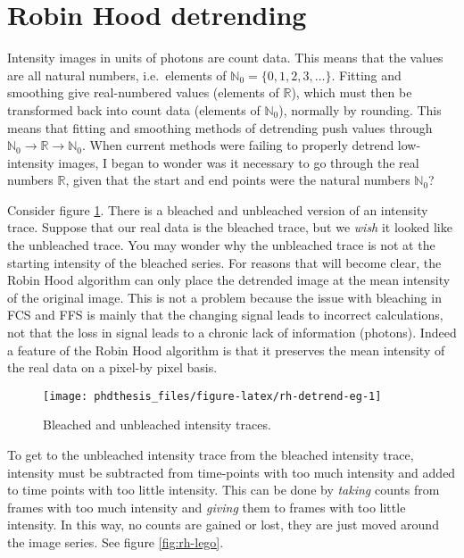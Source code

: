 \documentclass[12pt,]{book}
\theoremstyle{definition}
\theoremstyle{definition}
\theoremstyle{definition}
\theoremstyle{remark}
\begin{document}
\section{Robin Hood detrending}\label{robin-hood-detrending}

Intensity images in units of photons are count data. This means that the
values are all natural numbers, i.e.~elements of
\(\mathbb{N}_0=\{0, 1, 2, 3, \ldots\}\). Fitting and smoothing give
real-numbered values (elements of \(\mathbb{R}\)), which must then be
transformed back into count data (elements of \(\mathbb{N}_0\)),
normally by rounding. This means that fitting and smoothing methods of
detrending push values through
\(\mathbb{N}_0 \rightarrow \mathbb{R} \rightarrow \mathbb{N}_0\). When
current methods were failing to properly detrend low-intensity images, I
began to wonder was it necessary to go through the real numbers
\(\mathbb{R}\), given that the start and end points were the natural
numbers \(\mathbb{N}_0\)?

Consider figure \ref{fig:rh-detrend-eg}. There is a bleached and
unbleached version of an intensity trace. Suppose that our real data is
the bleached trace, but we \emph{wish} it looked like the unbleached
trace. You may wonder why the unbleached trace is not at the starting
intensity of the bleached series. For reasons that will become clear,
the Robin Hood algorithm can only place the detrended image at the mean
intensity of the original image. This is not a problem because the issue
with bleaching in FCS and FFS is mainly that the changing signal leads
to incorrect calculations, not that the loss in signal leads to a
chronic lack of information (photons). Indeed a feature of the Robin
Hood algorithm is that it preserves the mean intensity of the real data
on a pixel-by pixel basis.



\begin{figure}

\texttt{[image: phdthesis\_files/figure-latex/rh-detrend-eg-1]} \hfill{}

\caption{Bleached and unbleached intensity traces.}\label{fig:rh-detrend-eg}
\end{figure}

To get to the unbleached intensity trace from the bleached intensity
trace, intensity must be subtracted from time-points with too much
intensity and added to time points with too little intensity. This can
be done by \emph{taking} counts from frames with too much intensity and
\emph{giving} them to frames with too little intensity. In this way, no
counts are gained or lost, they are just moved around the image series.
See figure \ref{fig:rh-lego}.
\end{document}
